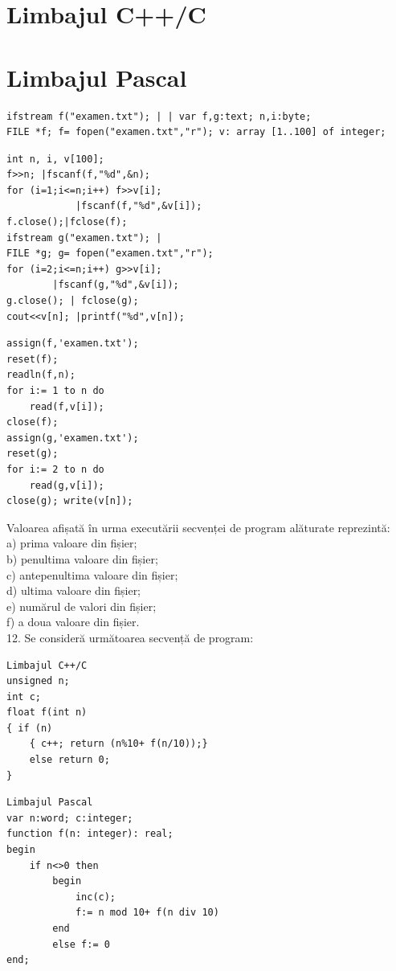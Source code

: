\documentclass[10pt]{article}
\begin{document}
\section*{Limbajul C++/C}
\section*{Limbajul Pascal}
\begin{verbatim}
ifstream f("examen.txt"); | | var f,g:text; n,i:byte;
FILE *f; f= fopen("examen.txt","r"); v: array [1..100] of integer;
\end{verbatim}

\begin{verbatim}
int n, i, v[100];
f>>n; |fscanf(f,"%d",&n);
for (i=1;i<=n;i++) f>>v[i];
            |fscanf(f,"%d",&v[i]);
f.close();|fclose(f);
ifstream g("examen.txt"); |
FILE *g; g= fopen("examen.txt","r");
for (i=2;i<=n;i++) g>>v[i];
        |fscanf(g,"%d",&v[i]);
g.close(); | fclose(g);
cout<<v[n]; |printf("%d",v[n]);
\end{verbatim}

\begin{verbatim}
assign(f,'examen.txt');
reset(f);
readln(f,n);
for i:= 1 to n do
    read(f,v[i]);
close(f);
assign(g,'examen.txt');
reset(g);
for i:= 2 to n do
    read(g,v[i]);
close(g); write(v[n]);
\end{verbatim}

Valoarea afișată în urma executării secvenței de program alăturate reprezintă:\\
a) prima valoare din fișier;\\
b) penultima valoare din fișier;\\
c) antepenultima valoare din fișier;\\
d) ultima valoare din fișier;\\
e) numărul de valori din fișier;\\
f) a doua valoare din fișier.\\
12. Se consideră următoarea secvență de program:

\begin{verbatim}
Limbajul C++/C
unsigned n;
int c;
float f(int n)
{ if (n)
    { c++; return (n%10+ f(n/10));}
    else return 0;
}
\end{verbatim}

\begin{verbatim}
Limbajul Pascal
var n:word; c:integer;
function f(n: integer): real;
begin
    if n<>0 then
        begin
            inc(c);
            f:= n mod 10+ f(n div 10)
        end
        else f:= 0
end;
\end{verbatim}
\end{document}
